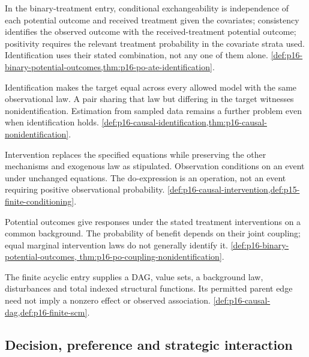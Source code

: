\begin{description}[style=nextline,leftmargin=0pt]
In the binary-treatment entry, conditional exchangeability is independence
of each potential outcome and received treatment given the covariates;
consistency identifies the observed outcome with the received-treatment
potential outcome; positivity requires the relevant treatment probability
in the covariate strata used. Identification uses their stated combination,
not any one of them alone.
\cref{def:p16-binary-potential-outcomes,thm:p16-po-ate-identification}.
\item[Identification; estimation; nonidentification.]
Identification makes the target equal across every allowed model with
the same observational law. A pair sharing that law but differing in
the target witnesses nonidentification. Estimation from sampled data
remains a further problem even when identification holds.
\cref{def:p16-causal-identification,thm:p16-causal-nonidentification}.
\item[Intervention; observation.]
Intervention replaces the specified equations while preserving the other
mechanisms and exogenous law as stipulated. Observation conditions on an
event under unchanged equations. The do-expression is an operation, not
an event requiring positive observational probability.
\cref{def:p16-causal-intervention,def:p15-finite-conditioning}.
\item[Potential outcome; probability of benefit.]
Potential outcomes give responses under the stated treatment interventions
on a common background. The probability of benefit depends on their joint
coupling; equal marginal intervention laws do not generally identify it.
\cref{def:p16-binary-potential-outcomes,
thm:p16-po-coupling-nonidentification}.
\item[Structural causal model.]
The finite acyclic entry supplies a DAG, value sets, a background law,
disturbances and total indexed structural functions. Its permitted parent
edge need not imply a nonzero effect or observed association.
\cref{def:p16-causal-dag,def:p16-finite-scm}.
\end{description}

\subsection{Decision, preference and strategic interaction}
\label{sec:p14-glossary-decision}

